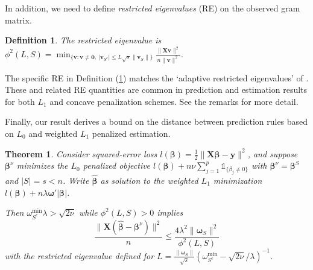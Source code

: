 \documentclass[12pt]{article}
\newtheorem{theorem}{\sc Theorem}[section]
\newtheorem{definition}{\sc Definition}[section]
\newcommand{\bs}[1]{\boldsymbol{#1}}
\newcommand{\mr}[1]{\mathrm{#1}}
\newcommand{\bm}[1]{\mathbf{#1}}
\newcommand{\ds}[1]{\mathds{#1}}
\begin{document}
In addition, we need to define {\it restricted eigenvalues} (RE) on the observed gram matrix.  
\begin{definition}\label{redef}
The restricted eigenvalue is
$
\phi^2(L,S) = \min_{\{\bm{v}: \bm{v}\neq \bm{0},~|\bm{v}_{S^c}| \leq L\sqrt{s}\|\bm{v}_S\|\}}\frac{\|\bm{X}\bm{v}\|^2}{n\|\bm{v}\|^2}$.
\end{definition}
\noindent The specific RE in Definition (\ref{redef}) matches the `adaptive restricted eigenvalues' of \cite{buhlmann_statistics_2011}.  These and related RE quantities are common in prediction and estimation results for both $L_1$ and concave penalization schemes.  See the remarks for more detail.

Finally, our result derives a bound on the distance between prediction rules based on $L_0$ and weighted $L_1$ penalized estimation.
\begin{theorem} \label{sparseapprox}  Consider squared-error loss $l(\bs{\beta}) =
\frac{1}{2}\|\bm{X}\bs{\beta}-\bm{y}\|^2$, and suppose $\bs{\beta}^{\nu}$ minimizes the $L_0$ penalized objective $l(\bs{\beta}) + n\nu\sum_{j=1}^p\ds{1}_{\{\beta_j\neq0\}}$ with $\bs{\beta}^\nu = \bs{\beta}^S$ and $|S|=s<n$.   
Write $\bs{\hat\beta}$ as solution to the weighted $L_1$ minimization $l(\bs{\beta}) + n\lambda\bs{\omega}'|\bs{\beta}|$. 

Then  
$\omega^{\mr{min}}_{S^c}\lambda > \sqrt{2\nu}$ while $\phi^2(L,S) > 0$ implies
\begin{equation} \label{sparseineq}
\frac{\|\bm{X}(\bs{\hat\beta}-\bs{\beta}^\nu)\|^2}{n}\leq
\frac{4\lambda^2 \|\bs{\omega}_S\|^2}{\phi^2(L, S)}
\end{equation} 
with the restricted eigenvalue defined for 
 $L = \frac{\|\bs{\omega}_S\|}{\sqrt{s}}(\omega^{\mr{min}}_{S^c}-\sqrt{2\nu}/\lambda)^{-1}$.
\end{theorem}
\end{document}
